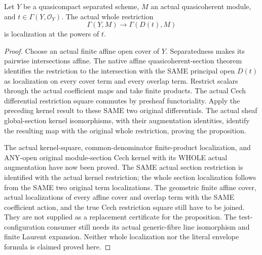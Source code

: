 \begin{proposition}
\label{prop:quasicompact-module-principal-localization}
Let $Y$ be a quasicompact separated scheme, $M$ an actual
quasicoherent module, and $t\in\Gamma(Y,\mathcal O_Y)$. The
actual whole restriction
\[
 \Gamma(Y,M)\longrightarrow\Gamma(D(t),M)
\]
is localization at the powers of $t$.
\notready
\end{proposition}
\begin{proof}
Choose an actual finite affine open cover of $Y$. Separatedness
makes its pairwise intersections affine. The native affine
quasicoherent-section theorem identifies the restriction to the
intersection with the SAME principal open $D(t)$ as localization
on every cover term and every overlap term. Restrict scalars
through the actual coefficient maps and take finite products.
The actual Cech differential restriction square commutes by
presheaf functoriality. Apply the preceding kernel result to
these SAME two original differentials. The actual sheaf
global-section kernel isomorphisms, with their augmentation
identities, identify the resulting map with the original whole
restriction, proving the proposition.

The actual kernel-square, common-denominator finite-product localization,
and ANY-open original module-section Cech kernel with its WHOLE actual
augmentation have now been proved. The SAME actual section restriction
is identified with the actual kernel restriction; the whole section
localization follows from the SAME two original term localizations.
The geometric finite affine cover,
actual localizations of every affine cover and overlap term with
the SAME coefficient action, and the true Cech restriction square
still have to be joined. They are not supplied as a replacement
certificate for the proposition. The test-configuration consumer still needs its
actual generic-fibre line isomorphism and finite Laurent
expansion. Neither whole localization nor the literal envelope
formula is claimed proved here.
\end{proof}
